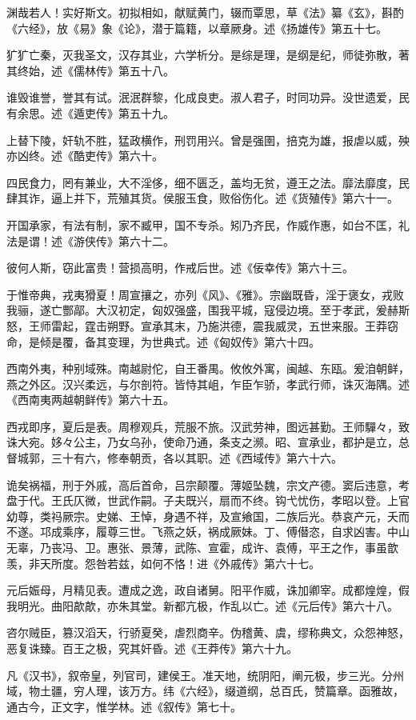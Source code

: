 \documentclass[]{article}
\begin{document}
渊哉若人！实好斯文。初拟相如，献赋黄门，辍而覃思，草《法》纂《玄》，斟酌《六经》，放《易》象《论》，潜于篇籍，以章厥身。述《扬雄传》第五十七。

犷犷亡秦，灭我圣文，汉存其业，六学析分。是综是理，是纲是纪，师徒弥散，著其终始，述《儒林传》第五十八。

谁毁谁誉，誉其有试。泯泯群黎，化成良吏。淑人君子，时同功异。没世遗爱，民有余思。述《遁吏传》第五十九。

上替下陵，奸轨不胜，猛政横作，刑罚用兴。曾是强圉，掊克为雄，报虐以威，殃亦凶终。述《酷吏传》第六十。

四民食力，罔有兼业，大不淫侈，细不匮乏，盖均无贫，遵王之法。靡法靡度，民肆其诈，逼上并下，荒殖其货。侯服玉食，败俗伤化。述《货殖传》第六十一。

开国承家，有法有制，家不臧甲，国不专杀。矧乃齐民，作威作惠，如台不匡，礼法是谓！述《游侠传》第六十二。

彼何人斯，窃此富贵！营损高明，作戒后世。述《佞幸传》第六十三。

于惟帝典，戎夷猾夏！周宣攘之，亦列《风》、《雅》。宗幽既昏，淫于褒女，戎败我骊，遂亡酆鄗。大汉初定，匈奴强盛，围我平城，寇侵边境。至于孝武，爰赫斯怒，王师雷起，霆击朔野。宣承其末，乃施洪德，震我威灵，五世来服。王莽窃命，是倾是覆，备其变理，为世典式。述《匈奴传》第六十四。

西南外夷，种别域殊。南越尉佗，自王番禺。攸攸外寓，闽越、东瓯。爰洎朝鲜，燕之外区。汉兴柔远，与尔剖符。皆恃其岨，乍臣乍骄，孝武行师，诛灭海隅。述《西南夷两越朝鲜传》第六十五。

西戎即序，夏后是表。周穆观兵，荒服不旅。汉武劳神，图远甚勤。王师驒々，致诛大宛。姼々公主，乃女乌孙，使命乃通，条支之濒。昭、宣承业，都护是立，总督城郭，三十有六，修奉朝贡，各以其职。述《西域传》第六十六。

诡矣祸福，刑于外戚，高后首命，吕宗颠覆。薄姬坠魏，宗文产德。窦后违意，考盘于代。王氏仄微，世武作嗣。子夫既兴，扇而不终。钩弋忧伤，孝昭以登。上官幼尊，类祃厥宗。史娣、王悼，身遇不祥，及宣飨国，二族后光。恭哀产元，夭而不遂。邛成乘序，履尊三世。飞燕之妖，祸成厥妹。丁、傅僣恣，自求凶害。中山无辜，乃丧冯、卫。惠张、景薄，武陈、宣霍，成许、袁傅，平王之作，事虽歆羡，非天所度。怨咎若兹，如何不恪！进《外戚传》第六十七。

元后娠母，月精见表。遭成之逸，政自诸舅。阳平作威，诛加卿宰。成都煌煌，假我明光。曲阳歊歊，亦朱其堂。新都亢极，作乱以亡。述《元后传》第六十八。

咨尔贼臣，篡汉滔天，行骄夏癸，虐烈商辛。伪稽黄、虞，缪称典文，众怨神怒，恶复诛臻。百王之极，究其奸昏。述《王莽传》第六十九。

凡《汉书》，叙帝皇，列官司，建侯王。准天地，统阴阳，阐元极，步三光。分州域，物土疆，穷人理，该万方。纬《六经》，缀道纲，总百氏，赞篇章。函雅故，通古今，正文字，惟学林。述《叙传》第七十。
\end{document}
